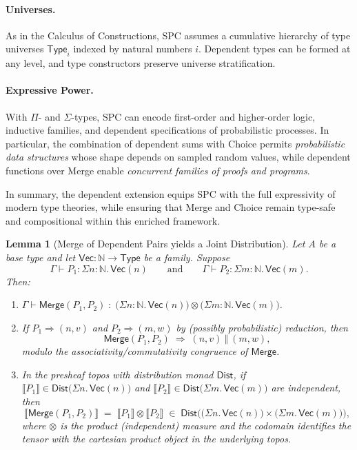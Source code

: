\documentclass{article}
\newtheorem{lemma}[theorem]{Lemma}
\begin{document}
\paragraph{Universes.}
As in the Calculus of Constructions, SPC assumes a cumulative hierarchy of type
universes $\mathsf{Type}_i$ indexed by natural numbers $i$. Dependent types can
be formed at any level, and type constructors preserve universe stratification.

\paragraph{Expressive Power.}
With $\Pi$- and $\Sigma$-types, SPC can encode first-order and higher-order
logic, inductive families, and dependent specifications of probabilistic
processes. In particular, the combination of dependent sums with Choice
permits \emph{probabilistic data structures} whose shape depends on sampled
random values, while dependent functions over Merge enable \emph{concurrent
families of proofs and programs}.

\medskip
In summary, the dependent extension equips SPC with the full expressivity of
modern type theories, while ensuring that Merge and Choice remain type-safe and
compositional within this enriched framework.

\begin{lemma}[Merge of Dependent Pairs yields a Joint Distribution]
\label{lem:merge-sigma-joint}
Let $A$ be a base type and let $\mathsf{Vec}:\mathbb{N}\to\mathsf{Type}$ be a
family. Suppose
\[
\Gamma \vdash P_1 : \Sigma n:\mathbb{N}.\,\mathsf{Vec}(n)
\qquad\text{and}\qquad
\Gamma \vdash P_2 : \Sigma m:\mathbb{N}.\,\mathsf{Vec}(m).
\]
Then:
\begin{enumerate}
\item[\textnormal{(Typing)}] $\Gamma \vdash \mathsf{Merge}(P_1,P_2) \;:\; 
      \big(\Sigma n:\mathbb{N}.\,\mathsf{Vec}(n)\big) \otimes 
      \big(\Sigma m:\mathbb{N}.\,\mathsf{Vec}(m)\big)$.
\item[\textnormal{(Operational)}] If $P_1 \Rightarrow (n,v)$ and $P_2 \Rightarrow (m,w)$
      by (possibly probabilistic) reduction, then
      \[
      \mathsf{Merge}(P_1,P_2) \;\Rightarrow\; (n,v)\ \Vert\ (m,w),
      \]
      modulo the associativity/commutativity congruence of $\mathsf{Merge}$.
\item[\textnormal{(Denotational)}] In the presheaf topos with distribution monad
      $\mathsf{Dist}$, if $\llbracket P_1 \rrbracket \in \mathsf{Dist}\!\big(\Sigma n.\,\mathsf{Vec}(n)\big)$
      and $\llbracket P_2 \rrbracket \in \mathsf{Dist}\!\big(\Sigma m.\,\mathsf{Vec}(m)\big)$
      are independent, then
      \[
      \llbracket \mathsf{Merge}(P_1,P_2) \rrbracket
      \;=\;
      \llbracket P_1 \rrbracket \otimes \llbracket P_2 \rrbracket
      \;\in\; \mathsf{Dist}\!\Big(\big(\Sigma n.\,\mathsf{Vec}(n)\big)\times\big(\Sigma m.\,\mathsf{Vec}(m)\big)\Big),
      \]
      where $\otimes$ is the product (independent) measure and the codomain
      identifies the tensor with the cartesian product object in the underlying topos.
\end{enumerate}
\end{lemma}
\end{document}
